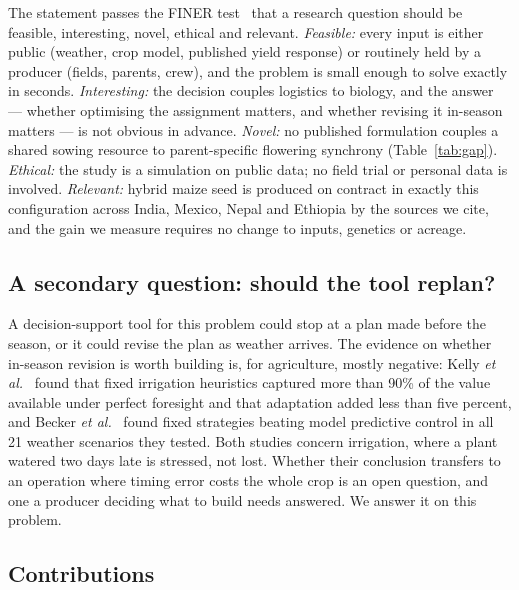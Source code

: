 \documentclass[10pt,twocolumn]{article}
\begin{document}
The statement passes the FINER test~\cite{hulley2013} that a research
question should be feasible, interesting, novel, ethical and relevant.
\emph{Feasible:} every input is either public (weather, crop model,
published yield response) or routinely held by a producer (fields, parents,
crew), and the problem is small enough to solve exactly in seconds.
\emph{Interesting:} the decision couples logistics to biology, and the
answer --- whether optimising the assignment matters, and whether revising
it in-season matters --- is not obvious in advance. \emph{Novel:} no
published formulation couples a shared sowing resource to parent-specific
flowering synchrony (Table~\ref{tab:gap}). \emph{Ethical:} the study is a
simulation on public data; no field trial or personal data is involved.
\emph{Relevant:} hybrid maize seed is produced on contract in exactly this
configuration across India, Mexico, Nepal and Ethiopia by the sources we
cite, and the gain we measure requires no change to inputs, genetics or
acreage.

\subsection{A secondary question: should the tool replan?}

A decision-support tool for this problem could stop at a plan made before
the season, or it could revise the plan as weather arrives. The evidence on
whether in-season revision is worth building is, for agriculture, mostly
negative: Kelly \textit{et al.}~\cite{kelly2023} found that fixed irrigation
heuristics captured more than 90\% of the value available under perfect
foresight and that adaptation added less than five percent, and Becker
\textit{et al.}~\cite{becker2026} found fixed strategies beating model
predictive control in all 21 weather scenarios they tested. Both studies
concern irrigation, where a plant watered two days late is stressed, not
lost. Whether their conclusion transfers to an operation where timing error
costs the whole crop is an open question, and one a producer deciding what
to build needs answered. We answer it on this problem.

\subsection{Contributions}
\end{document}
